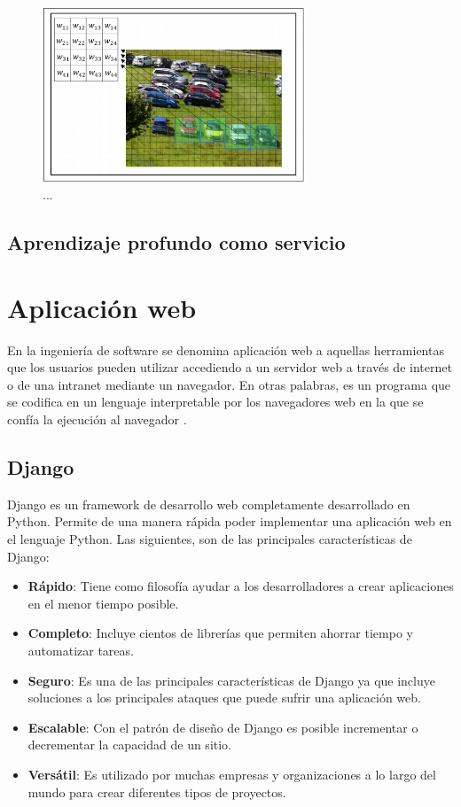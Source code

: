     
     \begin{figure}[H]
        \centering
        \includegraphics[width=0.7\textwidth]{capitulo2/images/CNN_window.png}
        \caption{...}
        \label{fig:CNNFilter}
    \end{figure}
    
    
    \subsection{Aprendizaje profundo como servicio}

\section{Aplicación web}
En la ingeniería de software se denomina aplicación web a aquellas herramientas que los usuarios pueden utilizar accediendo a un servidor web a través de internet o de una intranet mediante un navegador. En otras palabras, es un programa que se codifica en un lenguaje interpretable por los navegadores web en la que se confía la ejecución al navegador \cite{appweb}.

\subsection{Django}
Django es un framework de desarrollo web completamente desarrollado en Python. Permite de una manera rápida poder implementar una aplicación web en el lenguaje Python. Las siguientes, son de las principales características de Django:

\begin{itemize}
    \item \textbf{Rápido}: Tiene como filosofía ayudar a los desarrolladores a crear aplicaciones en el menor tiempo posible.
    \item \textbf{Completo}: Incluye cientos de librerías que permiten ahorrar tiempo y automatizar tareas.
    \item \textbf{Seguro}: Es una de las principales características de Django ya que incluye soluciones a los principales ataques que puede sufrir una aplicación web.
    \item \textbf{Escalable}: Con el patrón de diseño de Django es posible incrementar o decrementar la capacidad de un sitio.
    \item \textbf{Versátil}: Es utilizado por muchas empresas y organizaciones a lo largo del mundo para crear diferentes tipos de proyectos.
\end{itemize}

